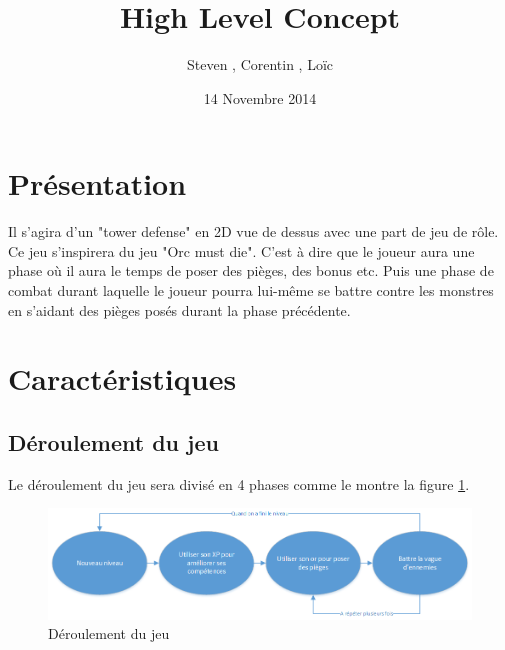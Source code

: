 \documentclass[12pt]{article}
\title{High Level Concept}
\author{Steven \bsc{Gerard}, Corentin \bsc{Raoult}, Loïc \bsc{Tessier}}
\date {14 Novembre 2014}
\begin{document}
\maketitle{}

\section{Présentation}
Il s’agira d’un "tower defense" en 2D vue de dessus avec une part de jeu de rôle. Ce jeu
s'inspirera du jeu "Orc must die". C'est à dire que le joueur aura une phase où il aura le temps
de poser des pièges, des bonus etc. Puis une phase de combat durant laquelle le joueur pourra
lui-même se battre contre les monstres en s'aidant des pièges posés durant la phase précédente.

\section{Caractéristiques}
\subsection{Déroulement du jeu}
Le déroulement du jeu sera divisé en 4 phases comme le montre la figure \ref{Deroulement du jeu}.
\begin{figure}[h]
\begin{center}
\includegraphics[scale=0.7]{deroulementDuJeu.png} 
\end{center}
\caption{Déroulement du jeu}
\label{Deroulement du jeu}
\end{figure}
\end{document}
